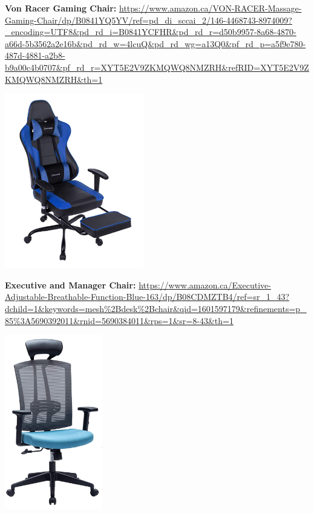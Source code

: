 \documentclass[11pt]{article}
\begin{document}
    \textbf{Von Racer Gaming Chair:} \url{https://www.amazon.ca/VON-RACER-Massage-Gaming-Chair/dp/B0841YQ5YV/ref=pd_di_sccai_2/146-4468743-8974009?_encoding=UTF8&pd_rd_i=B0841YCFHR&pd_rd_r=d50b9957-8a68-4870-a66d-5b3562a2e16b&pd_rd_w=4lcuQ&pd_rd_wg=a13Q0&pf_rd_p=a5f9e780-487d-4881-a2b8-b9a00c4b0707&pf_rd_r=XYT5E2V9ZKMQWQ8NMZRH&refRID=XYT5E2V9ZKMQWQ8NMZRH&th=1}
    \begin{center}
    \includegraphics[height = 3in]{VonRacer.PNG}
    \end{center}
    
    \newpage
    \textbf{Executive and Manager Chair:} \url{https://www.amazon.ca/Executive-Adjustable-Breathable-Function-Blue-163/dp/B08CDMZTB4/ref=sr_1_43?dchild=1&keywords=mesh\%2Bdesk\%2Bchair&qid=1601597179&refinements=p_85\%3A5690392011&rnid=5690384011&rps=1&sr=8-43&th=1}
    \begin{center}
    \includegraphics[height = 3in]{Executive and Manager.PNG}
    \end{center}
    
\end{document}
